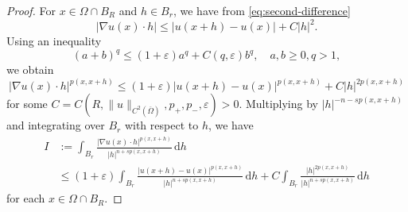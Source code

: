 \documentclass[10pt,a4paper]{amsart}
\begin{document}
\begin{proof}
For $x \in \Omega \cap B_{R}$ and $h \in B_{r}$, we have from \eqref{eq:second-difference}
\begin{equation*}
|\nabla u(x) \cdot h| \leq |u(x+h)-u(x)| + C |h|^2.
\end{equation*}
Using an inequality
\begin{equation} \label{eq:alg-ineq}
(a+b)^{q} \leq (1+\varepsilon)a^{q} + C(q, \varepsilon) b^{q}, \quad a, b \geq 0, q > 1,
\end{equation}
we obtain
\begin{equation*}
|\nabla u(x) \cdot h|^{p(x, x+h)} \leq (1+\varepsilon) |u(x+h)-u(x)|^{p(x, x+h)} + C |h|^{2p(x, x+h)}
\end{equation*}
for some $C = C(R, \|u\|_{C^{2}(\overline{\Omega})}, p_{+}, p_{-}, \varepsilon) > 0$. Multiplying by $|h|^{-n-sp(x, x+h)}$ and integrating over $B_{r}$ with respect to $h$, we have
\begin{equation} \label{eq:liminf-I}
\begin{split}
I
&:= \int_{B_{r}} \frac{|\nabla u(x) \cdot h|^{p(x, x+h)}}{|h|^{n+sp(x,x+h)}} \,\mathrm{d}h \\
&\leq (1+\varepsilon) \int_{B_{r}} \frac{|u(x+h)-u(x)|^{p(x, x+h)}}{|h|^{n+sp(x, x+h)}} \,\mathrm{d}h + C \int_{B_{r}} \frac{|h|^{2p(x, x+h)}}{|h|^{n+sp(x, x+h)}} \,\mathrm{d}h
\end{split}
\end{equation}
for each $x \in \Omega \cap B_{R}$.


\end{proof}
\end{document}

